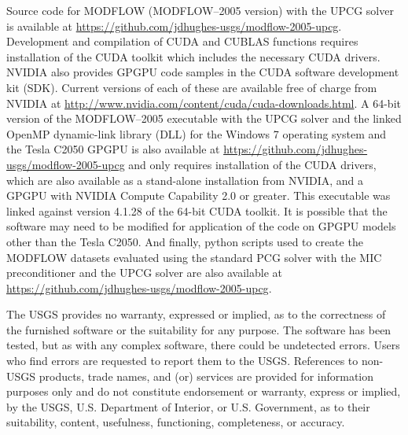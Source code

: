 \documentclass[12pt]{article}
\begin{document}
Source code for MODFLOW (MODFLOW--2005 version) with the UPCG solver is available at \url{https://github.com/jdhughes-usgs/modflow-2005-upcg}. Development and compilation of CUDA and CUBLAS functions requires installation of the CUDA toolkit which includes the necessary CUDA drivers. NVIDIA also provides GPGPU code samples in the CUDA software development kit (SDK). Current versions of each of these are available free of charge from NVIDIA at \url{http://www.nvidia.com/content/cuda/cuda-downloads.html}. A 64-bit version of the MODFLOW--2005 executable with the UPCG solver and the linked OpenMP dynamic-link library (DLL) for the Windows 7 operating system and the Tesla C2050 GPGPU is also available at \url{https://github.com/jdhughes-usgs/modflow-2005-upcg} and only requires installation of the CUDA drivers, which are also available as a stand-alone installation from NVIDIA, and a GPGPU with NVIDIA Compute Capability 2.0 or greater. This executable was linked against version 4.1.28 of the 64-bit CUDA toolkit. It is possible that the software may need to be modified for application of the code on GPGPU models other than the Tesla C2050. And finally, python scripts used to create the MODFLOW datasets evaluated using the standard PCG solver with the MIC preconditioner and the UPCG solver are also available at \url{https://github.com/jdhughes-usgs/modflow-2005-upcg}.

The USGS provides no warranty, expressed or implied, as to the correctness of the furnished software or the suitability for any purpose. The software has been tested, but as with any complex software, there could be undetected errors. Users who find errors are requested to report them to the USGS. References to non-USGS products, trade names, and (or) services are provided for information purposes only and do not constitute endorsement or warranty, express or implied, by the USGS, U.S. Department of Interior, or U.S. Government, as to their suitability, content, usefulness, functioning, completeness, or accuracy.\color{black}  
\end{document}
